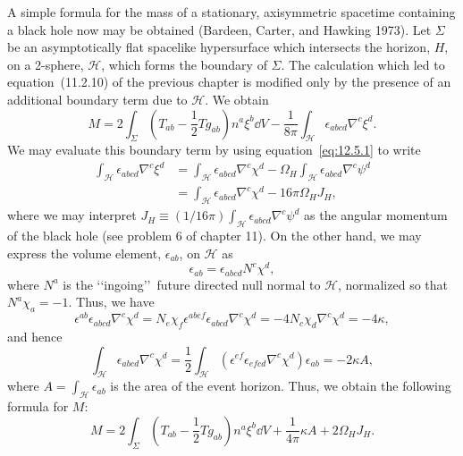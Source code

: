 A simple formula for the mass of a stationary, axisymmetric spacetime containing a
black hole now may be obtained (Bardeen, Carter, and Hawking 1973). Let
\(\Sigma\) be an asymptotically flat spacelike hypersurface which intersects the
horizon, \(H\), on a 2-sphere, \(\mathcal H\), which forms the boundary of
\(\Sigma\). The calculation which led to equation~(11.2.10) of the previous chapter
is modified only by the presence of an additional boundary term due to \(\mathcal H\).
We obtain
\begin{equation}
 M=2\int_\Sigma\left(T_{ab}-\frac12Tg_{ab}\right)n^a\xi^b\dd V
 -\frac1{8\pi}\int_{\mathcal H}\epsilon_{abcd}\nabla^c\xi^d .
 \tag{12.5.32}\label{eq:12.5.32}
\end{equation}
We may evaluate this boundary term by using equation~\eqref{eq:12.5.1} to write
\begin{equation}
\begin{aligned}
 \int_{\mathcal H}\epsilon_{abcd}\nabla^c\xi^d
 &=\int_{\mathcal H}\epsilon_{abcd}\nabla^c\chi^d
   -\Omega_H\int_{\mathcal H}\epsilon_{abcd}\nabla^c\psi^d\\
 &=\int_{\mathcal H}\epsilon_{abcd}\nabla^c\chi^d-16\pi\Omega_HJ_H ,
\end{aligned}
\tag{12.5.33}\label{eq:12.5.33}
\end{equation}
where we may interpret \(J_H\equiv(1/16\pi)\int_{\mathcal H}
\epsilon_{abcd}\nabla^c\psi^d\) as the angular momentum of the black hole (see
problem 6 of chapter 11). On the other hand, we may express the volume element,
\(\epsilon_{ab}\), on \(\mathcal H\) as
\begin{equation}
 \epsilon_{ab}=\epsilon_{abcd}N^c\chi^d ,
 \tag{12.5.34}\label{eq:12.5.34}
\end{equation}
where \(N^a\) is the \lq\lq ingoing\rq\rq\ future directed null normal to
\(\mathcal H\), normalized so that \(N^a\chi_a=-1\). Thus, we have
\begin{equation}
 \epsilon^{ab}\epsilon_{abcd}\nabla^c\chi^d
 =N_e\chi_f\epsilon^{abef}\epsilon_{abcd}\nabla^c\chi^d
 =-4N_c\chi_d\nabla^c\chi^d=-4\kappa ,
 \tag{12.5.35}\label{eq:12.5.35}
\end{equation}
and hence
\begin{equation}
 \int_{\mathcal H}\epsilon_{abcd}\nabla^c\chi^d
 =\frac12\int_{\mathcal H}(\epsilon^{ef}\epsilon_{efcd}\nabla^c\chi^d)\epsilon_{ab}
 =-2\kappa A ,
 \tag{12.5.36}\label{eq:12.5.36}
\end{equation}
where \(A=\int_{\mathcal H}\epsilon_{ab}\) is the area of the event horizon. Thus,
we obtain the following formula for \(M\):
\begin{equation}
 M=2\int_\Sigma\left(T_{ab}-\frac12Tg_{ab}\right)n^a\xi^b\dd V
 +\frac1{4\pi}\kappa A+2\Omega_HJ_H .
 \tag{12.5.37}\label{eq:12.5.37}
\end{equation}

